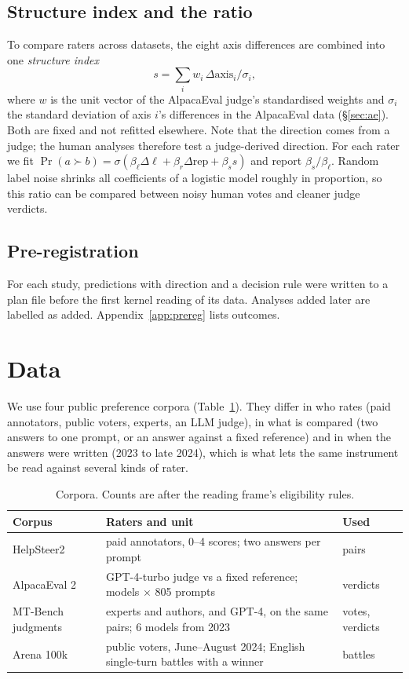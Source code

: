 \documentclass[11pt]{article}
\begin{document}
\subsection{Structure index and the ratio}
\label{sec:ratio}
To compare raters across datasets, the eight axis differences are combined into one \emph{structure index}
\[ s = \sum_{i} w_i\, \Delta\mathrm{axis}_i / \sigma_i ,\]
where $w$ is the unit vector of the AlpacaEval judge's standardised weights and $\sigma_i$ the standard deviation of axis $i$'s differences in the AlpacaEval data (\S\ref{sec:ae}). Both are fixed and not refitted elsewhere. Note that the direction comes from a judge; the human analyses therefore test a judge-derived direction. For each rater we fit $\Pr(a \succ b) = \sigma(\beta_\ell\Delta\ell + \beta_{r}\Delta\mathrm{rep} + \beta_s s)$ and report $\beta_s/\beta_\ell$. Random label noise shrinks all coefficients of a logistic model roughly in proportion, so this ratio can be compared between noisy human votes and cleaner judge verdicts.

\subsection{Pre-registration}
For each study, predictions with direction and a decision rule were written to a plan file before the first kernel reading of its data. Analyses added later are labelled as added. Appendix~\ref{app:prereg} lists outcomes.

\section{Data}
We use four public preference corpora (Table~\ref{tab:data}). They differ in who rates (paid annotators, public voters, experts, an LLM judge), in what is compared (two answers to one prompt, or an answer against a fixed reference) and in when the answers were written (2023 to late 2024), which is what lets the same instrument be read against several kinds of rater.
\begin{table}[H]\centering\small
\begin{tabularx}{\linewidth}{@{}lXl@{}}\toprule
Corpus & Raters and unit & Used \\\midrule
HelpSteer2 \cite{helpsteer2} & paid annotators, 0--4 scores; two answers per prompt & \hsPairs{} pairs \\
AlpacaEval 2 \cite{dubois} & GPT-4-turbo judge vs a fixed reference; \aeModels{} models $\times$ 805 prompts & \aeVerdicts{} verdicts \\
MT-Bench judgments \cite{zheng} & experts and authors, and GPT-4, on the same pairs; 6 models from 2023 & \mtHumanVotes{} votes, \mtGptVerdicts{} verdicts \\
Arena 100k \cite{explorer} & public voters, June--August 2024; English single-turn battles with a winner & \arBattles{} battles \\\bottomrule
\end{tabularx}
\caption{Corpora. Counts are after the reading frame's eligibility rules.}\label{tab:data}
\end{table}
\end{document}
